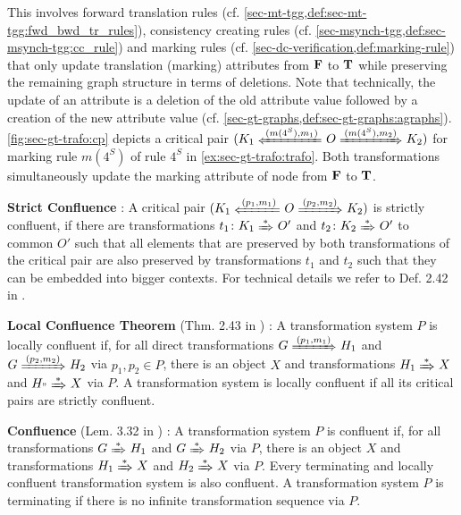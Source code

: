 \begin{enumerate*}
This involves forward translation rules (cf. \cref{sec-mt-tgg,def:sec-mt-tgg:fwd_bwd_tr_rules}), consistency creating rules (cf. \cref{sec-msynch-tgg,def:sec-msynch-tgg:cc_rule}) and marking rules (cf. \cref{sec-dc-verification,def:marking-rule}) that only update translation (marking) attributes from $\mathbf{F}$ to $\mathbf{T}$ while preserving the remaining graph structure in terms of deletions.
Note that technically, the update of an attribute is a deletion of the old attribute value followed by a creation of the new attribute value (cf. \cref{sec-gt-graphs,def:sec-gt-graphs:agraphs}).
\cref{fig:sec-gt-trafo:cp} depicts a critical pair $(K_1 \TransB{(m(4^S),m_1)} O \Trans{(m(4^S),m_2)} K_2)$ for marking rule $m(4^S)$ of rule $4^S$ in \cref{ex:sec-gt-trafo:trafo}.
Both transformations simultaneously update the marking attribute of node  from $\mathbf{F}$ to $\mathbf{T}$.
\item [\textbf{Strict Confluence}]: A critical pair $(K_1 \TransB{(p_1,m_1)} O \Trans{(p_2,m_2)} K_2)$ is strictly confluent, if there are transformations $t_1\colon K_1 \Trans{*} O'$ and $t_2\colon K_2 \Trans{*} O'$ to common $O'$ such that all elements that are preserved by both transformations of the critical pair are also preserved by transformations $t_1$ and $t_2$ such that they can be embedded into bigger contexts.
For technical details we refer to Def. 2.42 in \cite{FAGT2}.
\item [\textbf{Local Confluence Theorem} (Thm. 2.43 in \cite{FAGT2})]: A transformation system $P$ is locally confluent if, for all direct transformations $G \Trans{(p_1,m_1)} H_1$ and $G \Trans{(p_2,m_2)} H_2$ via $p_1,p_2 \in P$, there is an object $X$ and transformations $H_1 \Trans{*} X$ and $H_" \Trans{*} X$ via $P$.
A transformation system is locally confluent if all its critical pairs are strictly confluent.
\item [\textbf{Confluence} (Lem. 3.32 in \cite{Ehrig:2006:FAG:1121741})]: A transformation system $P$ is confluent if, for all transformations $G \Trans{*} H_1$ and $G \Trans{*} H_2$ via $P$, there is an object $X$ and transformations $H_1 \Trans{*} X$ and $H_2 \Trans{*} X$ via $P$.
Every terminating and locally confluent transformation system is also confluent.
A transformation system $P$ is terminating if there is no infinite transformation sequence via $P$.
\end{enumerate*}


